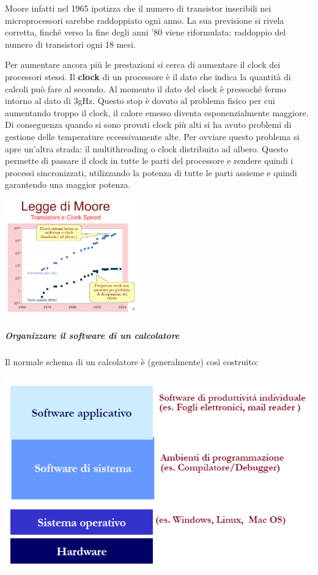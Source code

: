 \documentclass[
  paper=a4,
  oneside  ,captions=tableheading
]{scrbook}
\begin{document}
Moore infatti nel 1965 ipotizza che il numero di transistor inseribili
nei microprocessori sarebbe raddoppiato ogni anno. La sua previsione si
rivela corretta, finché verso la fine degli anni '80 viene riformulata:
raddoppio del numero di transistori ogni 18 mesi.

Per aumentare ancora più le prestazioni si cerca di aumentare il clock
dei processori stessi. Il \textbf{clock} di un processore è il dato che
indica la quantità di calcoli può fare al secondo. Al momento il dato
del clock è pressoché fermo intorno al dato di 3gHz. Questo stop è
dovuto al problema fisico per cui aumentando troppo il clock, il calore
emesso diventa esponenzialmente maggiore. Di conseguenza quando si sono
provati clock più alti si ha avuto problemi di gestione delle
temperature eccessivamente alte. Per ovviare questo problema si apre
un'altra strada: il multithreading o clock distribuito ad albero. Questo
permette di passare il clock in tutte le parti del processore e rendere
quindi i processi sincronizzati, utilizzando la potenza di tutte le
parti assieme e quindi garantendo una maggior potenza.

\includegraphics[height=5cm]{./image/image-20201111171947392.png}

\hypertarget{organizzare-il-software-di-un-calcolatore}{%
\subparagraph{Organizzare il software di un
calcolatore}\label{organizzare-il-software-di-un-calcolatore}}

Il normale schema di un calcolatore è (generalmente) così costruito:

\includegraphics{./image/image-20201111172243268.png}
\end{document}
